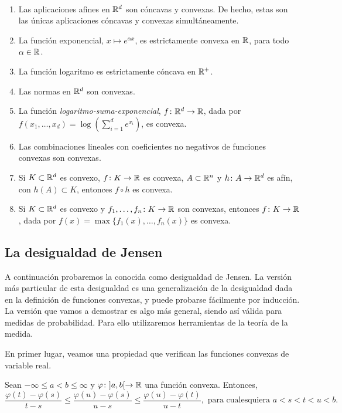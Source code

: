 \begin{example}~
    \begin{enumerate}
        \item Las aplicaciones afines en $\mathbb{R}^d$ son cóncavas y convexas. De hecho, estas son las únicas aplicaciones cóncavas y convexas simultáneamente.
        \item La función exponencial, $x \mapsto e^{\alpha x}$, es estrictamente convexa en $\mathbb{R}$, para todo $\alpha \in \mathbb{R}$.
        \item La función logaritmo es estrictamente cóncava en $\mathbb{R}^+$.
        \item Las normas en $\mathbb{R}^d$ son convexas.
        \item La función \emph{logaritmo-suma-exponencial}, $f\colon \mathbb{R}^d \to \mathbb{R}$, dada por $f(x_1,\dots,x_d) = \log(\sum_{i=1}^d e^{x_i})$, es convexa.
        \item Las combinaciones lineales con coeficientes no negativos de funciones convexas son convexas.
        \item Si $K \subset \mathbb{R}^d$ es convexo, $f \colon K \to \mathbb{R}$ es convexa, $A \subset \mathbb{R}^n$ y $h\colon A \to \mathbb{R}^d$ es afín, con $h(A) \subset K$, entonces $f \circ h$ es convexa.
        \item Si $K \subset \mathbb{R}^d$ es convexo y $f_1,\dots,f_n \colon K \to \mathbb{R}$ son convexas, entonces $f \colon K \to \mathbb{R}$, dada por $f(x) = \max\{f_1(x),\dots,f_n(x)\}$ es convexa.
    \end{enumerate}
\end{example}

\subsection{La desigualdad de Jensen}

A continuación probaremos la conocida como desigualdad de Jensen. La versión más particular de esta desigualdad es una generalización de la desigualdad dada en la definición de funciones convexas, y puede probarse fácilmente por inducción. La versión que vamos a demostrar es algo más general, siendo así válida para medidas de probabilidad. Para ello utilizaremos herramientas de la teoría de la medida.

En primer lugar, veamos una propiedad que verifican las funciones convexas de variable real.

\begin{lem} \label{lem:secantes}
    Sean $-\infty \le a < b \le \infty$ y $\varphi \colon ]a,b[ \to \mathbb{R}$ una función convexa. Entonces,
    \[ \frac{\varphi(t) - \varphi(s)}{t-s} \le \frac{\varphi(u)-\varphi(s)}{u - s} \le \frac{\varphi(u)-\varphi(t)}{u-t}, \text{ para cualesquiera } a < s < t < u < b.\]
\end{lem}

